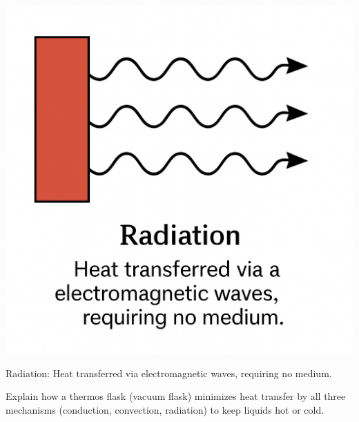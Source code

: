 \begin{marginfigure}[0pt]
\includegraphics[width=\linewidth]{radiation.png} %
\caption{Radiation: Heat transferred via electromagnetic waves, requiring no medium.}
\label{fig:radiation}
\end{marginfigure}

\begin{stopandthink}
Explain how a thermos flask (vacuum flask) minimizes heat transfer by all three mechanisms (conduction, convection, radiation) to keep liquids hot or cold.
\end{stopandthink}



